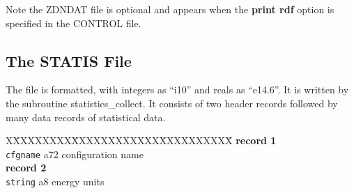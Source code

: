 Note the ZDNDAT file is optional and appears when the {\bf print
rdf} option is specified in the CONTROL file.

\subsection{The STATIS File}
\label{statis-file}

The file is formatted, with integers as ``i10'' and reals as
``e14.6''.  It is written by the subroutine {\sc
statistics\_collect}.  It consists of two header records followed
by many data records of statistical data.
\begin{tabbing}
X\=XXXXXXXX\=XXXXXXXXXXXX\=XXXXXXXXXX\=\kill
{\bf record 1} \\
\> {\tt cfgname} \> a72 \> configuration name \\
{\bf record 2} \\
\> {\tt string}  \> a8   \> energy units
\end{tabbing}

